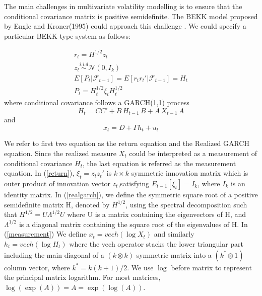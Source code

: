 \documentclass[titlepage,11pt]{article}
\begin{document}
The main challenges in multivariate volatility modelling is to ensure that the conditional covariance matrix is positive semidefinite. The BEKK model proposed by Engle and Kroner(1995) could approach this challenge .
We could specify a particular BEKK-type system as follows:


\begin{align}
	\label{return}
	r_t = H^{1/2} z_t \nonumber\\
	z_t \overset{i.i.d} {\sim} \mathcal{N}(0,I_k) \nonumber\\
	E[P_t|\mathcal{F}_{t-1}]=E[r_t r_t'|\mathcal{F}_{t-1}]=H_t \nonumber\\
	P_t = H_t^{1/2}\xi_t H_t^{1/2}
\end{align}
where conditional covariance follows a GARCH(1,1) process
\begin{equation}
	\label{realgarch}
	 H_t=CC'+ B\,  H_{t-1} \,B+A \,  X_{t-1} \, A
\end{equation}
and 
\begin{equation}
	\label{measurement}
	 x_t= D+ \Gamma  h_t+ u_t
\end{equation}

We refer to first two equation as the return equation and the Realized GARCH equation. Since the realized measure $X_t$ could be interpreted as a measurement of conditional covariance $H_t$, the last equation is referred as the measurement equation.
  In (\ref{return}), $\xi_t = z_t z_t'$ is $k \times k$ symmetric innovation matrix which is outer product of innovation vector $z_t$,satisfying $E_{t-1}[\xi_t]=I_k$, where $I_k$ is an identity matrix. 
In (\ref{realgarch}), we define the symmetric square root of a positive semidefinite matrix H, denoted by $H^{1/2}$, using the spectral decomposition such that $H^{1/2} = U \Lambda^{1/2} U$ where U is a matrix containing the eigenvectors of H, and $\Lambda^{1/2}$ is a diagonal matrix containing the square root of the eigenvalues of H. In (\ref{measurement}) We define $x_t = vech(\log X_t)$ and similarly $h_t = vech(\log H_t)$ where the vech operator stacks the lower triangular part including the main diagonal of a $(k \otimes k)$ symmetric matrix into a $(k^* \otimes 1)$ column vector, where $k^*= k(k+1)/2$. We use $\log$ before matrix to represent the principal matrix logarithm. For most matrices,$\log (\exp(A)) = A =\exp(\log(A))$. 
\end{document}

